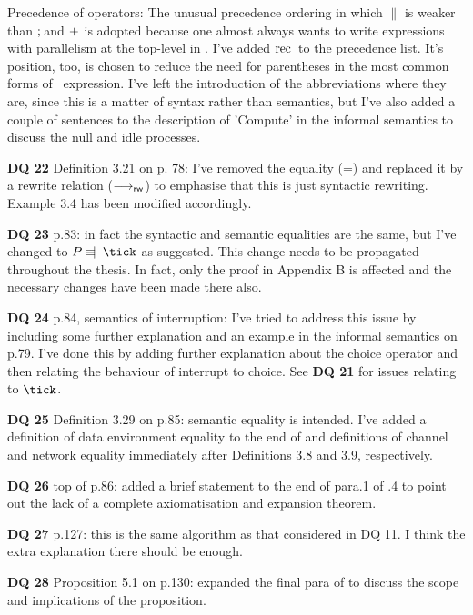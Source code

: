 \documentclass{article}
\begin{document}
\begin{trivlist}
Precedence of operators: The unusual precedence
ordering in which $\parallel$ is weaker than $\mathbin{\mathrm{;}\!}$ and $\mathbin{\mathrm{+}}$ is
adopted because one almost always wants to write expressions with
parallelism at the top-level in \bcandle. I've added $\mathrm{rec\,}$ to the
precedence list. It's position, too, is chosen to reduce the need for
parentheses in the most common forms of \bcandle\ expression. I've left
the introduction of the abbreviations where they are, since this is a
matter of syntax rather than semantics, but I've also added a couple
of sentences to the description of 'Compute' in the informal semantics
to discuss the null and idle processes.
\item[\bf DQ 22] Definition 3.21 on p. 78: I've removed the equality (=) and
replaced it by a rewrite relation (${\mathrel{{\stackrel{}{\longrightarrow_{\mathrm{\sf rw}}}}}}$) to emphasise that
this is just syntactic rewriting. Example 3.4 has been modified accordingly.
\item[\bf DQ 23] p.83: in fact the syntactic and semantic equalities
are the same, but I've changed to $P \nsyneq \tick$ as suggested. This change
needs to be propagated throughout the thesis. In fact, only the proof in 
Appendix B is affected and the necessary changes have been made there also.
\item[\bf DQ 24] p.84, semantics of interruption: I've tried to
address this issue by including some further explanation and an example
in the informal semantics on p.79. I've done this by adding further explanation
about the choice operator and then relating the behaviour of interrupt to 
choice. See \textbf{DQ 21} for issues relating to $\tick$.
\item[\bf DQ 25] Definition 3.29 on p.85: semantic equality is intended. I've 
added a definition of data environment equality to the end of  and
definitions of channel and network equality immediately after Definitions 3.8
and 3.9, respectively.
\item[\bf DQ 26] top of p.86: added a brief statement to the end of para.1 of
.4 to point out the lack of a complete axiomatisation and expansion
theorem.
\item[\bf DQ 27] p.127: this is the same algorithm as that considered in 
DQ 11. I think the extra explanation there should be enough.
\item[\bf DQ 28] Proposition 5.1 on p.130: expanded the final para of
 to discuss the scope and implications of the proposition.
\end{trivlist}
\end{document}
